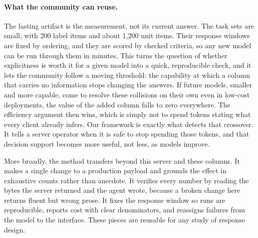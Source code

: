 \documentclass[sigconf]{ceurart}
\begin{document}
\paragraph{What the community can reuse.}
The lasting artifact is the measurement, not its current answer. The task sets are
small, with 200 label items and about 1{,}200 unit items. Their response windows
are fixed by ordering, and they are scored by checked criteria, so any new model
can be run through them in minutes. This turns the question of whether explicitness
is worth it for a given model into a quick, reproducible check, and it lets the
community follow a moving threshold: the capability at which a column that carries
no information stops changing the answers. If future models, smaller and more
capable, come to resolve these collisions on their own even in low-cost deployments,
the value of the added column falls to zero everywhere. The efficiency argument then
wins, which is simply not to spend tokens stating what every client already infers.
Our framework is exactly what detects that crossover. It tells a server operator
when it is safe to stop spending those tokens, and that decision support becomes more
useful, not less, as models improve.

More broadly, the method transfers beyond this server and these columns. It makes a
single change to a production payload and grounds the effect in exhaustive counts
rather than anecdote. It verifies every number by reading the bytes the server
returned and the agent wrote, because a broken change here returns fluent but wrong
prose. It fixes the response window so runs are reproducible, reports cost with
clear denominators, and reassigns failures from the model to the interface. These
pieces are reusable for any study of response design.
\end{document}
